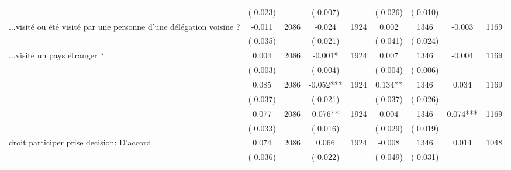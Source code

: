\begin{tabular}{l*{8}{c}}
                       &       (       0.023)            &                               &       (       0.007)            &                               &       (       0.026)            &       (       0.010) &                  \\
...visité ou été visité par une personne d'une délégation voisine ?        &             -0.011      &       2086       &             -0.024      &       1924       &              0.002      &       1346  &       -0.003 &       1169       \\
                       &       (       0.035)            &                               &       (       0.021)            &                               &       (       0.041)            &       (       0.024) &                  \\
...visité un pays étranger ?        &              0.004      &       2086       &             -0.001*      &       1924       &              0.007      &       1346  &       -0.004 &       1169       \\
                       &       (       0.003)            &                               &       (       0.004)            &                               &       (       0.004)            &       (       0.006) &                  \\
        &              0.085      &       2086       &             -0.052***      &       1924       &              0.134**      &       1346  &        0.034 &       1169       \\
                       &       (       0.037)            &                               &       (       0.021)            &                               &       (       0.037)            &       (       0.026) &                  \\
        &              0.077      &       2086       &              0.076**      &       1924       &              0.004      &       1346  &        0.074*** &       1169       \\
                       &       (       0.033)            &                               &       (       0.016)            &                               &       (       0.029)            &       (       0.019) &                  \\
droit participer prise decision: D'accord        &              0.074      &       2086       &              0.066      &       1924       &             -0.008      &       1346  &        0.014 &       1048       \\
                       &       (       0.036)            &                               &       (       0.022)            &                               &       (       0.049)            &       (       0.031) &                  \\

\end{tabular}
